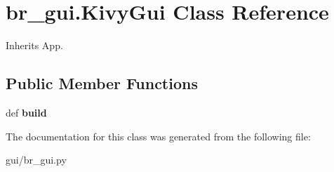 \hypertarget{classbr__gui_1_1KivyGui}{\section{br\-\_\-gui.\-Kivy\-Gui Class Reference}
\label{classbr__gui_1_1KivyGui}
}


Inherits App.

\subsection*{Public Member Functions}
\begin{DoxyCompactItemize}
\item 
\hypertarget{classbr__gui_1_1KivyGui_a26a703928c5909150ab3c9047c556e5f}{def {\bfseries build}}\label{classbr__gui_1_1KivyGui_a26a703928c5909150ab3c9047c556e5f}

\end{DoxyCompactItemize}


The documentation for this class was generated from the following file\-:\begin{DoxyCompactItemize}
\item 
gui/br\-\_\-gui.\-py\end{DoxyCompactItemize}
